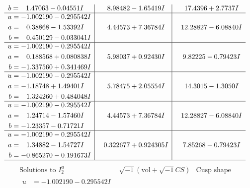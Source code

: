 \documentclass[1p]{elsarticle_modified}
\theoremstyle{definition}
\newcommand{\I}{\sqrt{-1}}
\begin{document}
$$\begin{array}{c|c|c}
\begin{aligned}
b &= \phantom{-}1.47063 - 0.04551 I\end{aligned}
 & \phantom{-}8.98482 - 1.65419 I & \phantom{-}17.4396 + 2.7737 I \\ \hline\begin{aligned}
u &= -1.002190 - 0.295542 I \\
a &= \phantom{-}0.38868 - 1.53392 I \\
b &= \phantom{-}0.450129 - 0.033041 I\end{aligned}
 & \phantom{-}4.44573 + 7.36784 I & \phantom{-}12.28827 - 6.08840 I \\ \hline\begin{aligned}
u &= -1.002190 - 0.295542 I \\
a &= \phantom{-}0.188568 + 0.080838 I \\
b &= -1.337560 + 0.341469 I\end{aligned}
 & \phantom{-}5.98037 + 0.92430 I & \phantom{-}9.82225 - 0.79423 I \\ \hline\begin{aligned}
u &= -1.002190 - 0.295542 I \\
a &= -1.18748 + 1.49401 I \\
b &= \phantom{-}1.324260 + 0.484048 I\end{aligned}
 & \phantom{-}5.78475 + 2.05554 I & \phantom{-}14.3015 - 1.3050 I \\ \hline\begin{aligned}
u &= -1.002190 - 0.295542 I \\
a &= \phantom{-}1.24714 - 1.57460 I \\
b &= -1.23357 - 0.71721 I\end{aligned}
 & \phantom{-}4.44573 + 7.36784 I & \phantom{-}12.28827 - 6.08840 I \\ \hline\begin{aligned}
u &= -1.002190 - 0.295542 I \\
a &= \phantom{-}1.34882 - 1.54727 I \\
b &= -0.865270 - 0.191673 I\end{aligned}
 & \phantom{-}0.322677 + 0.924305 I & \phantom{-}7.85268 - 0.79423 I\\
 \hline 
 \end{array}$$\newpage$$\begin{array}{c|c|c}  
\text{Solutions to }I^u_{2}& \I (\text{vol} + \sqrt{-1}CS) & \text{Cusp shape}\\
 \hline 
\begin{aligned}
u &= -1.002190 - 0.295542 I \\

\end{aligned}
\end{array}$$
\end{document}
